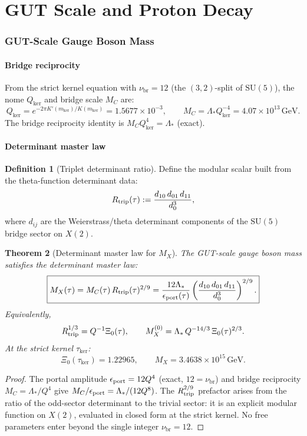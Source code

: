 \documentclass[12pt]{article}
\theoremstyle{plain}
\newtheorem{theorem}{Theorem}[section]
\theoremstyle{definition}
\newtheorem{definition}[theorem]{Definition}
\numberwithin{equation}{section}
\newcommand{\br}{\mathrm{br}}
\newcommand{\kker}{\mathrm{ker}}
\begin{document}
\part{GUT Scale and Proton Decay}

\section{GUT-Scale Gauge Boson Mass}\label{sec:MX}

\subsection{Bridge reciprocity}

From the strict kernel equation with $\nu_\br=12$ (the $(3,2)$-split of
$\mathrm{SU}(5)$), the nome $Q_{\ker}$ and bridge scale $M_C$ are:
\[
Q_{\ker} = e^{-2\pi K'(m_{\ker})/K(m_{\ker})} = 1.5677\times10^{-3},
\qquad
M_C = \Lambda_* Q_{\ker}^{-4} = 4.07\times10^{13}\,\mathrm{GeV}.
\]
The bridge reciprocity identity is $M_C Q_{\ker}^4 = \Lambda_*$ (exact).

\subsection{Determinant master law}

\begin{definition}[Triplet determinant ratio]
Define the modular scalar built from the theta-function determinant data:
\[
R_{\rm trip}(\tau) := \frac{d_{10}\,d_{01}\,d_{11}}{d_0^3},
\]
where $d_{ij}$ are the Weierstrass/theta determinant components of the
$\mathrm{SU}(5)$ bridge sector on $X(2)$.
\end{definition}

\begin{theorem}[Determinant master law for $M_X$]\label{thm:MX}
The GUT-scale gauge boson mass satisfies the determinant master law:
\[
\boxed{M_X(\tau) = M_C(\tau)\,R_{\rm trip}(\tau)^{2/9}
= \frac{12\Lambda_*}{\epsilon_{\rm port}(\tau)}
\left(\frac{d_{10}\,d_{01}\,d_{11}}{d_0^3}\right)^{2/9}.}
\]
Equivalently,
\[
R_{\rm trip}^{1/3} = Q^{-1}\Xi_0(\tau),
\qquad
M_X^{(0)} = \Lambda_*\,Q^{-14/3}\,\Xi_0(\tau)^{2/3}.
\]
At the strict kernel $\tau_{\kker}$:
\[
\Xi_0(\tau_{\kker}) = 1.22965,\qquad
M_X = 3.4638\times10^{15}\,\mathrm{GeV}.
\]
\end{theorem}

\begin{proof}
The portal amplitude $\epsilon_{\rm port}=12Q^4$ (exact, $12=\nu_\br$)
and bridge reciprocity $M_C=\Lambda_*/Q^4$ give
$M_C/\epsilon_{\rm port}=\Lambda_*/(12Q^8)$.
The $R_{\rm trip}^{2/9}$ prefactor arises from the ratio of the
odd-sector determinant to the trivial sector: it is an explicit modular
function on $X(2)$, evaluated in closed form at the strict kernel.
No free parameters enter beyond the single integer $\nu_\br=12$.
\end{proof}
\end{document}
